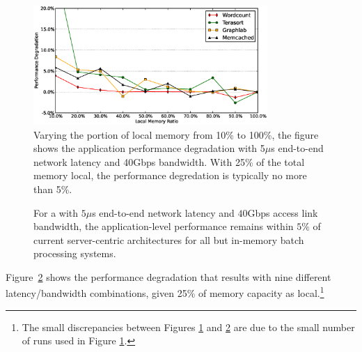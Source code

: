 %
\begin{figure}
  \centering
    \includegraphics[width = 3.5in]{img/vary_remote_mem.eps} 
  \caption{\small{Varying the portion of local memory from 10\% to 100\%, the figure shows the application performance degradation with 5$\mu$s end-to-end network latency and 40Gbps bandwidth. With 25\% of the total memory local, the performance degredation is typically no more than 5\%. }}
  \label{fig:impb}
\end{figure}
%
%
\begin{figure}

  \centering
  \caption{\small{For a \dis with $5\mu$s end-to-end network latency and $40$Gbps access link bandwidth, the application-level performance remains within $5\%$ of current server-centric architectures for all but in-memory batch processing systems.}}
  \label{fig:latb}
\end{figure}
%
Figure~\ref{fig:latb} shows the performance degradation that results with nine different latency/bandwidth combinations, given 25\% of memory capacity as local.\footnote{The small discrepancies between Figures \ref{fig:impb} and \ref{fig:latb} are due to the small number of runs used in Figure \ref{fig:impb}.} %

